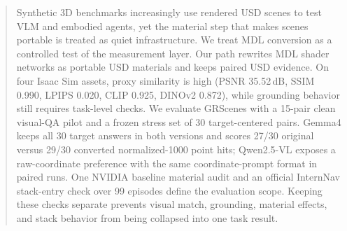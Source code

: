 \begin{abstract}
\raggedright\relax
Synthetic 3D benchmarks increasingly use rendered USD scenes to test VLM and
embodied agents, yet the material step that makes scenes portable is treated as
quiet infrastructure. We treat MDL conversion as a controlled test of the
measurement layer. Our path rewrites MDL shader
networks as portable USD materials and keeps paired USD evidence. On four Isaac
Sim assets, proxy similarity is high (PSNR 35.52\,dB, SSIM 0.990, LPIPS 0.020,
CLIP 0.925, \mbox{DINOv2} 0.872), while grounding behavior still requires
task-level checks. We evaluate GRScenes with a 15-pair clean visual-QA pilot
and a frozen stress set of 30 target-centered pairs. Gemma4 keeps all 30
target answers in both versions and scores 27/30 original versus 29/30
converted normalized-1000 point hits; \mbox{Qwen2.5-VL} exposes a
raw-coordinate preference with the same coordinate-prompt format in paired runs. One
NVIDIA baseline material audit and an official \mbox{InternNav} stack-entry check over
99 episodes define the evaluation scope. Keeping these checks separate prevents
visual match, grounding, material effects, and stack behavior from being
collapsed into one task result.
\end{abstract}
